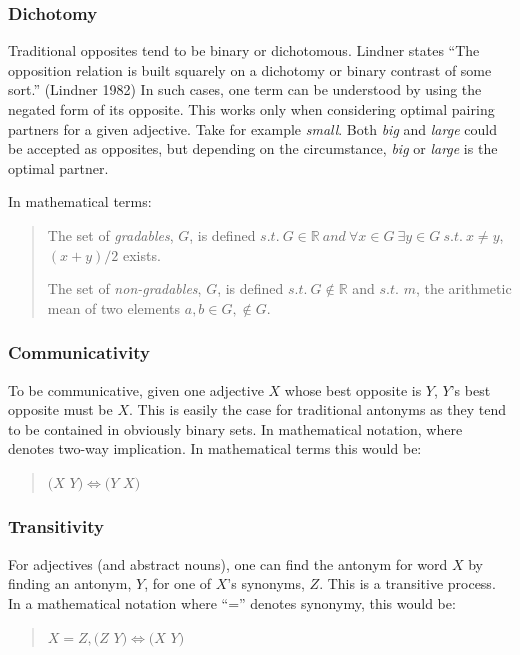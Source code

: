 \subsubsection {Dichotomy} 
Traditional opposites tend to be binary or dichotomous.  Lindner states ``The opposition relation is built squarely on a dichotomy or binary contrast of some sort.'' (Lindner 1982) In such cases, one term can be understood by using the negated form of its opposite.  This works only when considering optimal pairing partners for a given adjective.  Take for example \textit{small}.  Both \textit{big} and \textit{large} could be accepted as opposites, but depending on the circumstance, \textit{big} or \textit{large} is the optimal partner.

In mathematical terms: 
	\begin{quote}
		The set of \textit{gradables}, $G$, is defined $s.t.~G \in \mathbb{R}~and~\forall x \in G~\exists y \in G~s.t.~x\not=y$, $(x+y)/2$ exists.

		The set of \textit{non-gradables}, $G$, is defined $s.t.~G \not\in \mathbb{R}$ and $s.t.$ $m$, the arithmetic mean of two elements $a, b \in G, \not\in G$.
	\end{quote}

\subsubsection {Communicativity} 
To be communicative, given one adjective $X$ whose best opposite is $Y$, $Y$’s best opposite must be $X$.  This is easily the case for traditional antonyms as they tend to be contained in obviously binary sets. In mathematical notation, where  denotes two-way implication.  In mathematical terms this would be: 
	\begin{quote}
		$(X$ \opp $Y) \Leftrightarrow (Y$ \opp $X)$
	\end{quote}

\subsubsection {Transitivity} 
For adjectives (and abstract nouns), one can find the antonym for word $X$ by finding an antonym, $Y$, for one of $X$’s synonyms, $Z$.  This is a transitive process.  In a mathematical notation where ``='' denotes synonymy, this would be: 
	\begin{quote}
		$X = Z, (Z$ \opp $Y) \Leftrightarrow (X$ \opp $Y)$
	\end{quote}

